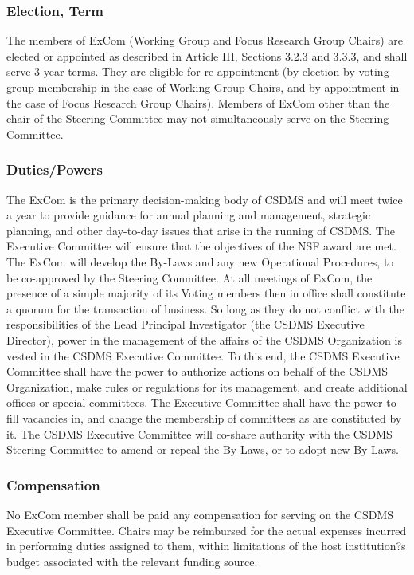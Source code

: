 \documentclass[11pt, oneside]{article}   	%
\begin{document}
\subsubsection{Election, Term}

The members of ExCom (Working Group and Focus Research Group Chairs) are elected or appointed as described in Article III, Sections 3.2.3 and 3.3.3, and shall serve 3-year terms.  They are eligible for re-appointment (by election by voting group membership in the case of Working Group Chairs, and by appointment in the case of Focus Research Group Chairs). Members of ExCom other than the chair of the Steering Committee may not simultaneously serve on the Steering Committee.  

\subsubsection{Duties/Powers}
	
The ExCom is the primary decision-making body of CSDMS and will meet twice a year to provide guidance for annual planning and management, strategic planning, and other day-to-day issues that arise in the running of CSDMS. The Executive Committee will ensure that the objectives of the NSF award are met. The ExCom will develop the By-Laws and any new Operational Procedures, to be co-approved by the Steering Committee. At all meetings of ExCom, the presence of a simple majority of its Voting members then in office shall constitute a quorum for the transaction of business. So long as they do not conflict with the responsibilities of the Lead Principal Investigator (the CSDMS Executive Director), power in the management of the affairs of the CSDMS Organization is vested in the CSDMS Executive Committee. To this end, the CSDMS Executive Committee shall have the power to authorize actions on behalf of the CSDMS Organization, make rules or regulations for its management, and create additional offices or special committees. The Executive Committee shall have the power to fill vacancies in, and change the membership of committees as are constituted by it.  The CSDMS Executive Committee will co-share authority with the CSDMS Steering Committee to amend or repeal the By-Laws, or to adopt new By-Laws.

\subsubsection{Compensation}
	
No ExCom member shall be paid any compensation for serving on the CSDMS Executive Committee. Chairs may be reimbursed for the actual expenses incurred in performing duties assigned to them, within limitations of the host institution?s budget associated with the relevant funding source.
\end{document}
